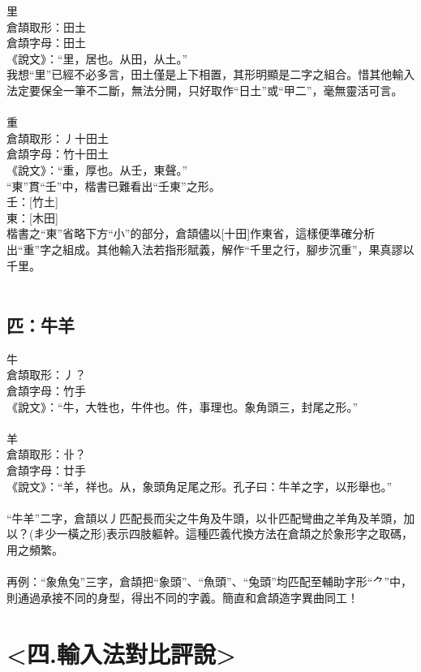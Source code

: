 \documentclass{article}
\begin{document}
里\\
倉頡取形：田土\\
倉頡字母：田土\\
《說文》：“里，居也。从田，从土。”\\
我想“里”已經不必多言，田土僅是上下相置，其形明顯是二字之組合。惜其他輸入法定要保全一筆不二斷，無法分開，只好取作“日土”或“甲二”，毫無靈活可言。\\
\\
重\\
倉頡取形：丿十田土\\
倉頡字母：竹十田土\\
《說文》：“重，厚也。从壬，東聲。”\\
“東”貫“壬”中，楷書已難看出“壬東”之形。\\
壬：[竹土]\\
東：[木田]\\
楷書之“東”省略下方“小”的部分，倉頡儘以[十田]作東省，這樣便準確分析出“重”字之組成。其他輸入法若指形賦義，解作“千里之行，腳步沉重”，果真謬以千里。\\
\\
\subsection{匹：牛羊}

牛\\
倉頡取形：丿？\\
倉頡字母：竹手\\
《說文》：“牛，大牲也，牛件也。件，事理也。象角頭三，封尾之形。”\\
\\
羊\\
倉頡取形：卝？\\
倉頡字母：廿手\\
《說文》：“羊，祥也。从，象頭角足尾之形。孔子曰：牛羊之字，以形舉也。”\\
\\
“牛羊”二字，倉頡以丿匹配長而尖之牛角及牛頭，以卝匹配彎曲之羊角及羊頭，加以？(丯少一橫之形)表示四肢軀幹。這種匹義代換方法在倉頡之於象形字之取碼，用之頻繁。\\
\\
再例：“象魚兔”三字，倉頡把“象頭”、“魚頭”、“兔頭”均匹配至輔助字形“⺈”中，則通過承接不同的身型，得出不同的字義。簡直和倉頡造字異曲同工！\\



\section{<四.輸入法對比評說>}
\end{document}
